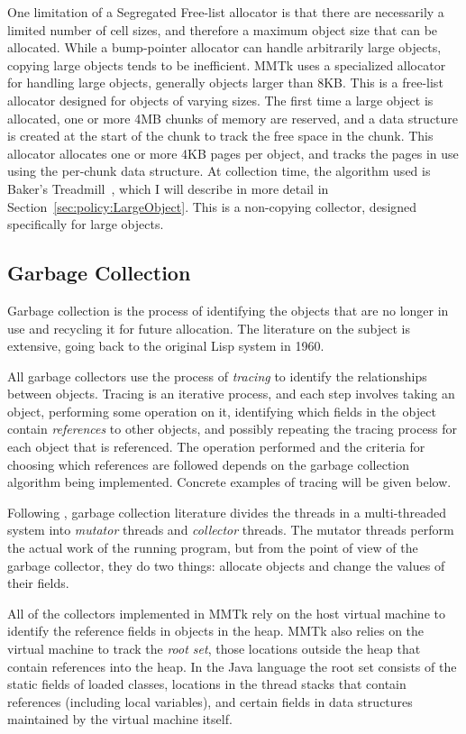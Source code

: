 One limitation of a Segregated Free-list allocator is that there are necessarily a limited number of 
cell sizes, and therefore a maximum object size that can be allocated.  While a bump-pointer allocator
can handle arbitrarily large objects, copying large objects tends to be inefficient.  MMTk uses
a specialized allocator for handling large objects, generally objects larger than 8KB.  This
is a free-list allocator designed for objects of varying sizes.
The first time a large object is allocated, one or more 4MB chunks of memory are reserved,
and a data structure is created at the start of the chunk to track the free space in the chunk.
This allocator allocates one or more 4KB pages per object, and tracks the pages in use using the
per-chunk data structure.
At collection time, the algorithm used is Baker's Treadmill~\cite{Baker:92}, which I will describe
in more detail in Section~\ref{sec:policy:LargeObject}.  This is a non-copying collector, designed
specifically for large objects.

\subsection{Garbage Collection}

Garbage collection is the process of identifying the objects that are no longer in use and 
recycling it for future allocation.  The literature on the subject is extensive, going back to
the original Lisp system in 1960.

All garbage collectors use the process of \emph{tracing} to identify the relationships between 
objects.  Tracing is an iterative process, and each step involves taking an object, 
performing some operation on it, identifying
which fields in the object contain \emph{references} to other objects, and possibly repeating 
the tracing process for each object that is referenced.  The operation performed and the criteria
for choosing which references are followed depends on the garbage collection algorithm being 
implemented.  Concrete examples of tracing will be given below.

Following \citet{DLM+:76}, garbage collection literature divides the threads in a multi-threaded
system into \emph{mutator} threads and \emph{collector} threads.  The mutator threads perform the actual
work of the running program, but from the point of view of the garbage collector, they do two
things: allocate objects and change the values of their fields.

All of the collectors implemented in MMTk rely on the host virtual machine to identify the 
reference fields in objects in the heap.  MMTk also relies on the virtual machine to track the
\emph{root set}, those locations outside the heap that contain references into the heap.  In 
the Java language the root set consists of the static fields of loaded classes,  
locations in the thread stacks that contain references (including local variables), and certain
fields in data structures maintained by the virtual machine itself.

